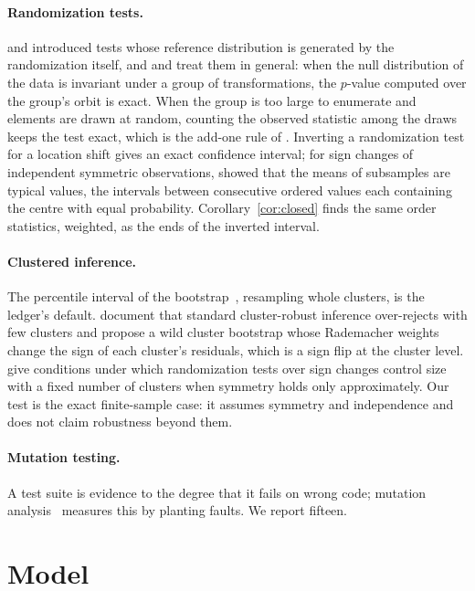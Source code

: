 \documentclass[11pt]{article}
\theoremstyle{plain}
\theoremstyle{definition}
\theoremstyle{remark}
\begin{document}
\paragraph{Randomization tests.} \citet{fisher1935} and \citet{pitman1937} introduced tests whose
reference distribution is generated by the randomization itself, and \citet{good2005} and
\citet{lehmann2005} treat them in general: when the null distribution of the data is invariant
under a group of transformations, the $p$-value computed over the group's orbit is exact. When the
group is too large to enumerate and elements are drawn at random, counting the observed statistic
among the draws keeps the test exact, which is the add-one rule of \citet{phipson2010}. Inverting a
randomization test for a location shift gives an exact confidence interval; for sign changes of
independent symmetric observations, \citet{hartigan1969} showed that the means of subsamples are
typical values, the intervals between consecutive ordered values each containing the centre with
equal probability. Corollary~\ref{cor:closed} finds the same order statistics, weighted, as the
ends of the inverted interval.

\paragraph{Clustered inference.} The percentile interval of the bootstrap~\cite{efron1993},
resampling whole clusters, is the ledger's default. \citet{cameron2008} document that standard
cluster-robust inference over-rejects with few clusters and propose a wild cluster bootstrap whose
Rademacher weights change the sign of each cluster's residuals, which is a sign flip at the cluster
level. \citet{canay2017} give conditions under which randomization tests over sign changes control
size with a fixed number of clusters when symmetry holds only approximately. Our test is the exact
finite-sample case: it assumes symmetry and independence and does not claim robustness beyond them.

\paragraph{Mutation testing.} A test suite is evidence to the degree that it fails on wrong code;
mutation analysis~\cite{demillo1978} measures this by planting faults. We report fifteen.

\section{Model}\label{sec:model}
\end{document}
